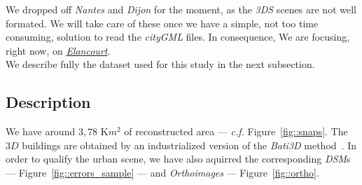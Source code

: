 \documentclass[../main.tex]{subfiles}
\begin{document}
    We dropped off \textit{Nantes} and \textit{Dijon} for the moment, as the \textit{3DS} scenes are not well formated. We will take care of these once we have a simple, not too time consuming, solution to read the \textit{cityGML} files. In consequence, We are focusing, right now, on \href{https://www.google.fr/maps/place/%C3%89lancourt/@48.7781732,1.9536264,5868m/data=!3m1!1e3!4m13!1m7!3m6!1s0x47e68370e965167b:0x705d83a4167c877c!2s%C3%89lancourt!3b1!8m2!3d48.782907!4d1.960077!3m4!1s0x47e68370e965167b:0x705d83a4167c877c!8m2!3d48.782907!4d1.960077}{\textit{Elancourt}}.\\

    We describe fully the dataset used for this study in the next subsection.

    \subsection{Description}

    We have around $3,78\text{ K}m^2$ of reconstructed area --- \textit{c.f.} Figure~\ref{fig::snaps}. The $3D$ buildings are obtained by an industrialized version of the \textit{Bati3D} method~\cite{durupt2006automatic, taillandier2004automatic}. In order to qualify the urban scene, we have also aquirred the corresponding \textit{DSM}s --- Figure~\ref{fig::errors_sample} --- and \textit{Orthoimages} --- Figure~\ref{fig::ortho}.
\end{document}
